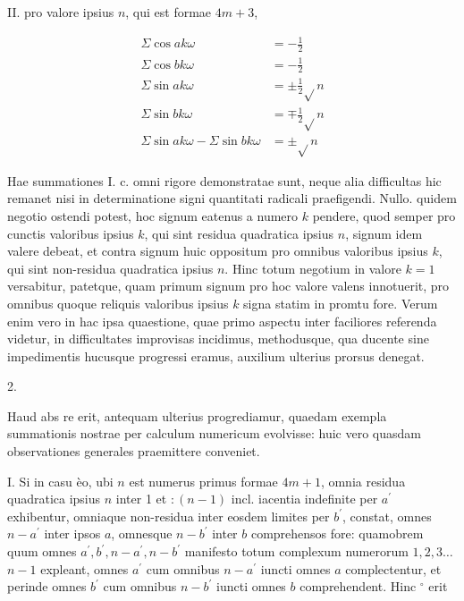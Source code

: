 \documentclass[10pt]{article}
\begin{document}
II. pro valore ipsius \(n\), qui est formae \(4 m+3\),

\[
\begin{aligned}
\Sigma \cos a k \omega & =-\frac{1}{2} \\
\Sigma \cos b k \omega & =-\frac{1}{2} \\
\Sigma \sin a k \omega & = \pm \frac{1}{2} \sqrt{ } n \\
\Sigma \sin b k \omega & =\mp \frac{1}{2} \sqrt{ } n \\
\Sigma \sin a k \omega-\Sigma \sin b k \omega & = \pm \sqrt{ } n
\end{aligned}
\]

Hae summationes I. c. omni rigore demonstratae sunt, neque alia difficultas hic remanet nisi in determinatione signi quantitati radicali praefigendi. Nullo. quidem negotio ostendi potest, hoc signum eatenus a numero \(k\) pendere, quod semper pro cunctis valoribus ipsius \(k\), qui sint residua quadratica ipsius \(n\), signum idem valere debeat, et contra signum huic oppositum pro omnibus valoribus ipsius \(k\), qui sint non-residua quadratica ipsius \(n\). Hinc totum negotium in valore \(k=1\) versabitur, patetque, quam primum signum pro hoc valore valens innotuerit, pro omnibus quoque reliquis valoribus ipsius \(k\) signa statim in promtu fore. Verum enim vero in hac ipsa quaestione, quae primo aspectu inter faciliores referenda videtur, in difficultates improvisas incidimus, methodusque, qua ducente sine impedimentis hucusque progressi eramus, auxilium ulterius prorsus denegat.

2.

Haud abs re erit, antequam ulterius progrediamur, quaedam exempla summationis nostrae per calculum numericum evolvisse: huic vero quasdam observationes generales praemittere conveniet.

I. Si in casu èo, ubi \(n\) est numerus primus formae \(4 m+1\), omnia residua quadratica ipsius \(n\) inter 1 et \(:(n-1)\) incl. iacentia indefinite per \(a^{\prime}\) exhibentur, omniaque non-residua inter eosdem limites per \(b^{\prime}\), constat, omnes \(n-a^{\prime}\) inter ipsos \(a\), omnesque \(n-b^{\prime}\) inter \(b\) comprehensos fore: quamobrem quum omnes \(a^{\prime}, b^{\prime}, n-a^{\prime}, n-b^{\prime}\) manifesto totum complexum numerorum \(1,2,3 \ldots\) \(n-1\) expleant, omnes \(a^{\prime}\) cum omnibus \(n-a^{\prime}\) iuncti omnes \(a\) complectentur, et perinde omnes \(b^{\prime}\) cum omnibus \(n-b^{\prime}\) iuncti omnes \(b\) comprehendent. Hinc \({ }^{\circ}\) erit
\end{document}
